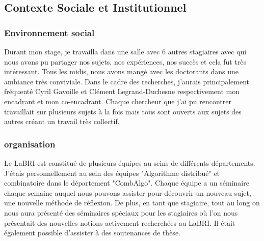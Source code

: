 \subsection{Contexte Sociale et Institutionnel}

\subsubsection{Environnement social}

Durant mon stage, je travailla dans une salle avec 6 autres stagiaires avec qui nous avons pu partager nos sujets, nos expériences, nos succès et cela fut très intéressant. Tous les midis, nous avons mangé avec les doctorants dans une ambiance très conviviale. 
Dans le cadre des recherches, j'aurais principalement fréquenté Cyril Gavoille et Clément Legrand-Duchesne respectivement mon encadrant et mon co-encadrant. Chaque chercheur que j'ai pu rencontrer travaillait sur plusieurs sujets à la fois mais tous sont ouverts aux sujets des autres créant un travail très collectif.

\subsubsection{organisation} Le LaBRI est constitué de plusieurs équipes au seins de différents départements. J'étais personnellement au sein des équipes "Algorithme distribué" et combinatoire dans le département "CombAlgo". Chaque équipe a un séminaire chaque semaine auquel nous pouvons assister pour découvrir un nouveau sujet, une nouvelle méthode de réflexion. De plus, en tant que stagiaire, tout au long on nous aura présenté des séminaires spéciaux pour les stagiaires où l'on nous présentait des nouvelles notions activement recherchées au LaBRI. Il était également possible d'assister à des soutenances de thèse.